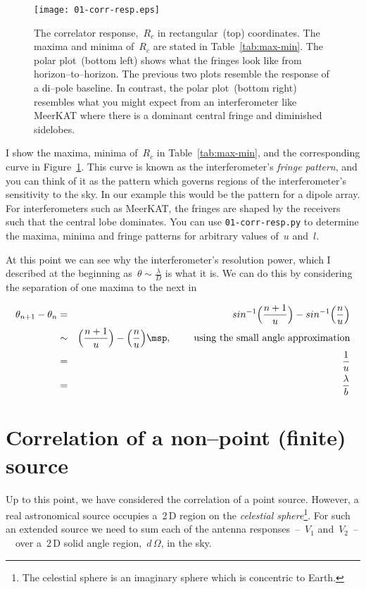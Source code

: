 \begin{figure}
  \centering
    \texttt{[image: 01-corr-resp.eps]}
  \caption[]{The correlator response,~$R_c$ in rectangular~(top) coordinates. The maxima and minima of~$R_c$ are stated in Table~\ref{tab:max-min}. The polar plot~(bottom left) shows what the fringes look like from horizon--to--horizon. The previous two plots resemble the response of a di--pole baseline. In contrast, the polar plot~(bottom right) resembles what you might expect from an interferometer like MeerKAT where there is a dominant central fringe and diminished sidelobes.}
  \label{fig:corr-resp}
\end{figure}

I show the maxima, minima of~$R_c$ in Table~\ref{tab:max-min}, and the corresponding curve in Figure~\ref{fig:corr-resp}. This curve is known as the interferometer's \emph{fringe pattern}, and you can think of it as the pattern which governs regions of the interferometer's sensitivity to the sky. In our example this would be the pattern for a dipole array. For interferometers such as MeerKAT, the fringes are shaped by the receivers such that the central lobe dominates. You can use \texttt{01-corr-resp.py} to determine the maxima, minima and fringe patterns for arbitrary values of~$u$ and~$l$.

At this point we can see why the interferometer's resolution power, which I described at the beginning as~$\theta \sim \frac{\lambda}{D}$ is what it is. We can do this by considering the separation of one maxima to the next in

\begin{eqnarray}
  \label{eq:10}
  \theta _{n+1} - \theta _n &=& sin^{-1}\Big(\frac{n+1}{u}\Big) - sin^{-1}\Big(\frac{n}{u}\Big) \nonumber \\
                           &\sim & \Big(\frac{n+1}{u}\Big) - \Big(\frac{n}{u}\Big) \msp , \hspace{0.8cm} \mbox{using the small angle approximation} \nonumber \\
                           &=& \frac{1}{u}       \nonumber \\
                           &=& \frac{\lambda}{b} \nonumber
\end{eqnarray}


\section{Correlation of a non--point (finite) source}
\label{osec:Correlation-of-a-non-point-source}
Up to this point, we have considered the correlation of a point source. However, a real astronomical source occupies a~2\,D region on the \emph{celestial sphere}\footnote{The celestial sphere is an imaginary sphere which is concentric to Earth.}. For such an extended source we need to sum each of the antenna responses~--~$V_1$ and~$V_2$~--~~over a~2\,D solid angle region,~$d\,\Omega $, in the sky.


